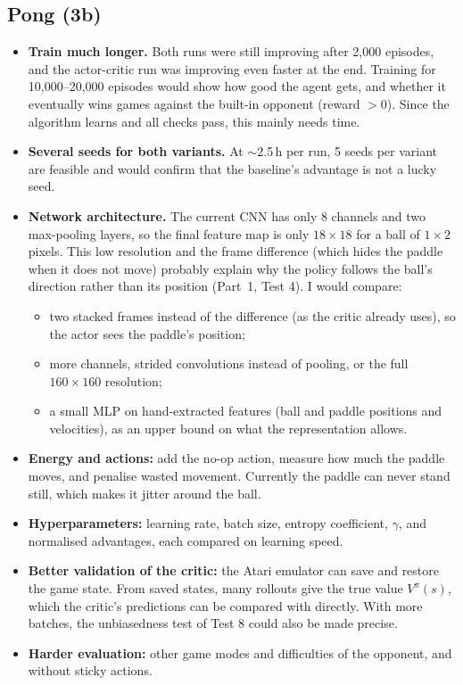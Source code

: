 \subsection{Pong (3b)}

\begin{itemize}
  \item \textbf{Train much longer.} Both runs were still improving after 2,000 episodes, and the actor-critic run was improving even faster at the end. Training for 10,000--20,000 episodes would show how good the agent gets, and whether it eventually wins games against the built-in opponent (reward $> 0$). Since the algorithm learns and all checks pass, this mainly needs time.
  \item \textbf{Several seeds for both variants.} At $\sim$2.5\,h per run, 5 seeds per variant are feasible and would confirm that the baseline's advantage is not a lucky seed.
  \item \textbf{Network architecture.} The current CNN has only 8 channels and two max-pooling layers, so the final feature map is only $18 \times 18$ for a ball of $1 \times 2$ pixels. This low resolution and the frame difference (which hides the paddle when it does not move) probably explain why the policy follows the ball's direction rather than its position (Part~1, Test 4). I would compare:
  \begin{itemize}
    \item two stacked frames instead of the difference (as the critic already uses), so the actor sees the paddle's position;
    \item more channels, strided convolutions instead of pooling, or the full $160 \times 160$ resolution;
    \item a small MLP on hand-extracted features (ball and paddle positions and velocities), as an upper bound on what the representation allows.
  \end{itemize}
  \item \textbf{Energy and actions:} add the no-op action, measure how much the paddle moves, and penalise wasted movement. Currently the paddle can never stand still, which makes it jitter around the ball.
  \item \textbf{Hyperparameters:} learning rate, batch size, entropy coefficient, $\gamma$, and normalised advantages, each compared on learning speed.
  \item \textbf{Better validation of the critic:} the Atari emulator can save and restore the game state. From saved states, many rollouts give the true value $V^\pi(s)$, which the critic's predictions can be compared with directly. With more batches, the unbiasedness test of Test 8 could also be made precise.
  \item \textbf{Harder evaluation:} other game modes and difficulties of the opponent, and without sticky actions.
\end{itemize}

